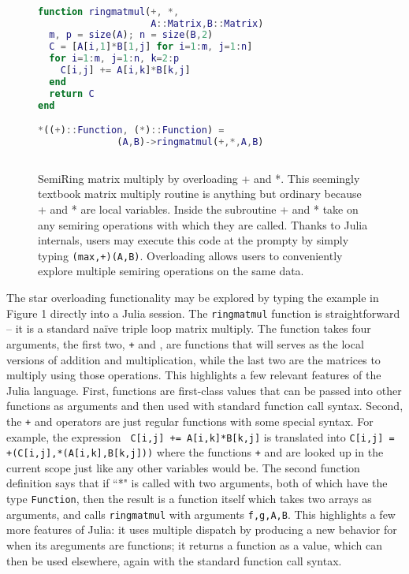\documentclass[conference]{IEEEtran}
\begin{document}
\begin{figure}
\begin{lstlisting}[language=matlab, frame=single]

function ringmatmul(+, *, 
                    A::Matrix,B::Matrix)
  m, p = size(A); n = size(B,2)
  C = [A[i,1]*B[1,j] for i=1:m, j=1:n]
  for i=1:m, j=1:n, k=2:p
    C[i,j] += A[i,k]*B[k,j]
  end
  return C
end

*((+)::Function, (*)::Function) = 
              (A,B)->ringmatmul(+,*,A,B)
             
\end{lstlisting}
\label{fig:ringmm}
\caption{SemiRing matrix multiply by overloading + and *.  This seemingly textbook
matrix multiply routine is anything but ordinary because + and * are local variables.  Inside the subroutine + and * take on any semiring operations with which they are called.
Thanks to Julia internals,
users may execute this code at the prompty by simply typing  {\tt *(max,+)(A,B)}.  \newline
Overloading allows users to conveniently explore multiple semiring operations on the same data.
}
\end{figure}

The star overloading functionality may be explored by
typing the example in Figure 1 directly into a Julia
session. The {\tt ringmatmul} function is straightforward -- it is a
standard na\"ive triple loop matrix multiply.  The function takes four
arguments, the first two, {\tt +} and {\tt *}, are functions that will
serves as the local versions of addition and multiplication, while the
last two are the matrices to multiply using those operations.  This
highlights a few relevant features of the Julia language.  First,
functions are first-class values that can be passed into other
functions as arguments and then used with standard function call
syntax.  Second, the {\tt +} and {\tt *} operators are just regular
functions with some special syntax.  For example, the expression {\tt
  C[i,j] += A[i,k]*B[k,j]} is translated into {\tt C[i,j] =
  +(C[i,j],*(A[i,k],B[k,j]))} where the functions {\tt +} and {\tt *}
are looked up in the current scope just like any other variables would
be.  The second function definition says that if ``*" is called with
two arguments, both of which have the type {\tt Function}, then the
result is a function itself which takes two arrays as arguments, and
calls {\tt ringmatmul} with arguments {\tt f,g,A,B}.  This highlights
a few more features of Julia: it uses multiple dispatch by producing a
new behavior for {\tt *} when its areguments are functions; it returns
a function as a value, which can then be used elsewhere, again with
the standard function call syntax.
\end{document}
